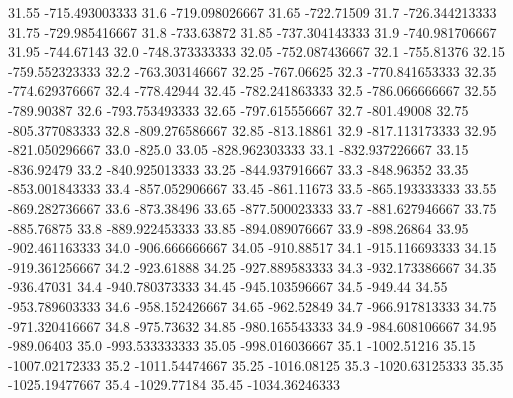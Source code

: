           31.55   -715.493003333
           31.6   -719.098026667
          31.65       -722.71509
           31.7   -726.344213333
          31.75   -729.985416667
           31.8       -733.63872
          31.85   -737.304143333
           31.9   -740.981706667
          31.95       -744.67143
           32.0   -748.373333333
          32.05   -752.087436667
           32.1       -755.81376
          32.15   -759.552323333
           32.2   -763.303146667
          32.25       -767.06625
           32.3   -770.841653333
          32.35   -774.629376667
           32.4       -778.42944
          32.45   -782.241863333
           32.5   -786.066666667
          32.55       -789.90387
           32.6   -793.753493333
          32.65   -797.615556667
           32.7       -801.49008
          32.75   -805.377083333
           32.8   -809.276586667
          32.85       -813.18861
           32.9   -817.113173333
          32.95   -821.050296667
           33.0           -825.0
          33.05   -828.962303333
           33.1   -832.937226667
          33.15       -836.92479
           33.2   -840.925013333
          33.25   -844.937916667
           33.3       -848.96352
          33.35   -853.001843333
           33.4   -857.052906667
          33.45       -861.11673
           33.5   -865.193333333
          33.55   -869.282736667
           33.6       -873.38496
          33.65   -877.500023333
           33.7   -881.627946667
          33.75       -885.76875
           33.8   -889.922453333
          33.85   -894.089076667
           33.9       -898.26864
          33.95   -902.461163333
           34.0   -906.666666667
          34.05       -910.88517
           34.1   -915.116693333
          34.15   -919.361256667
           34.2       -923.61888
          34.25   -927.889583333
           34.3   -932.173386667
          34.35       -936.47031
           34.4   -940.780373333
          34.45   -945.103596667
           34.5          -949.44
          34.55   -953.789603333
           34.6   -958.152426667
          34.65       -962.52849
           34.7   -966.917813333
          34.75   -971.320416667
           34.8       -975.73632
          34.85   -980.165543333
           34.9   -984.608106667
          34.95       -989.06403
           35.0   -993.533333333
          35.05   -998.016036667
           35.1      -1002.51216
          35.15   -1007.02172333
           35.2   -1011.54474667
          35.25      -1016.08125
           35.3   -1020.63125333
          35.35   -1025.19477667
           35.4      -1029.77184
          35.45   -1034.36246333
